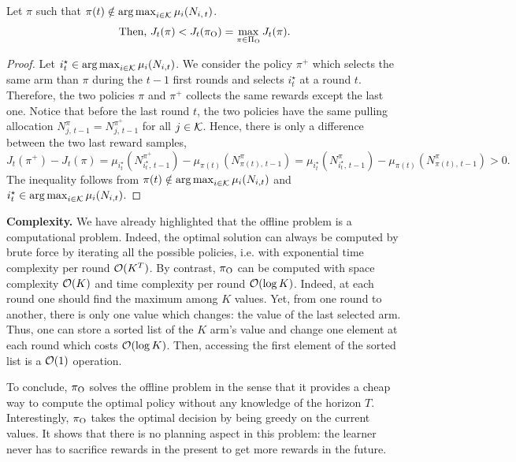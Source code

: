 \begin{proposition}
Let $\pi$ such that $\pi(t) \notin \operatorname*{arg\,max}_{i\in \mathcal{K}} \mu_i(N_{i,\,t})$.
\[\text{Then, } J_t(\pi) < J_t(\pi_{\rm O}) = \max_{\pi \in \Pi_{\rm O}} J_t(\pi).\]
\end{proposition}
\begin{proof}
Let $i^\star_t \in \operatorname*{arg\,max}_{i\in \mathcal{K}} \mu_i(N_{i,t})$. We consider the policy $\pi^+$ which selects the same arm than $\pi$ during the $t-1$ first rounds and selects $i^\star_t$ at a round $t$. Therefore, the two policies $\pi$ and $\pi^+$ collects the same rewards except the last one. Notice that before the last round $t$, the two policies have the same pulling allocation $N_{j,\,t-1}^\pi = N_{j,\,t-1}^{\pi^+}$ for all $j \in \mathcal{K}$.  Hence, there is only a difference between the two last reward samples,
\[ 
J_t(\pi^+) - J_t(\pi) =  \mu_{i^\star_t}(N_{i^\star_t,\,t-1}^{\pi^+}) - \mu_{\pi(t)}(N_{\pi(t),\,t-1}^{\pi}) = \mu_{i^\star_t}(N_{i^\star_t,\,t-1}^{\pi}) - \mu_{\pi(t)}(N_{\pi(t),\,t-1}^{\pi}) > 0.
\]
%
The inequality follows from $\pi(t) \notin \operatorname*{arg\,max}_{i\in \mathcal{K}} \mu_i(N_{i,t})$ and $i^\star_t \in \operatorname*{arg\,max}_{i\in \mathcal{K}} \mu_i(N_{i,t})$.
\end{proof}
\begin{remark}
%
\textbf{Complexity.} We have already highlighted that the offline problem is a computational problem. Indeed, the optimal solution can always be computed by brute force by iterating all the possible policies, i.e. with exponential time complexity per round $\mathcal{O}(K^T)$. By contrast, $\pi_{\rm O}$ can be computed with space complexity $\mathcal{O}(K)$ and time complexity per round $\mathcal{O}(\log{K})$. Indeed, at each round one should find the maximum among $K$ values. Yet, from one round to another, there is only one value which changes: the value of the last selected arm. Thus, one can store a sorted list of the $K$ arm's value and change one element at each round which costs $\mathcal{O}(\log{K})$. Then, accessing the first element of the sorted list is a $\mathcal{O}(1)$ operation.
\end{remark}
%
To conclude, $\pi_{\rm O}$ solves the offline problem in the sense that it provides a cheap way to compute the optimal policy without any knowledge of the horizon $T$. Interestingly, $\pi_{\rm O}$ takes the optimal decision by being greedy on the current values. It shows that there is no planning aspect in this problem: the learner never has to sacrifice rewards in the present to get more rewards in the future.
%
